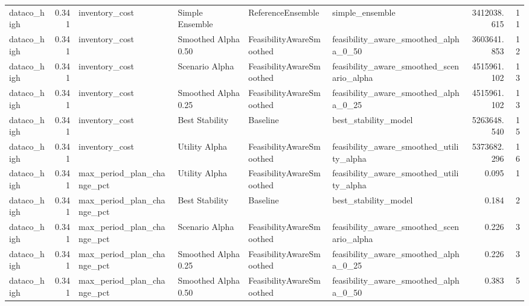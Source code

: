 \begin{table}
{\begin{tabular}{lrllllrr}
   dataco\_high &             0.341 &              inventory\_cost &       Simple Ensemble &         ReferenceEnsemble &                                    simple\_ensemble &   3412038.615 &              11 \\
   dataco\_high &             0.341 &              inventory\_cost &   Smoothed Alpha 0.50 &  FeasibilityAwareSmoothed &              feasibility\_aware\_smoothed\_alpha\_0\_50 &   3603641.853 &              12 \\
   dataco\_high &             0.341 &              inventory\_cost &        Scenario Alpha &  FeasibilityAwareSmoothed &          feasibility\_aware\_smoothed\_scenario\_alpha &   4515961.102 &              13 \\
   dataco\_high &             0.341 &              inventory\_cost &   Smoothed Alpha 0.25 &  FeasibilityAwareSmoothed &              feasibility\_aware\_smoothed\_alpha\_0\_25 &   4515961.102 &              13 \\
   dataco\_high &             0.341 &              inventory\_cost &        Best Stability &                  Baseline &                               best\_stability\_model &   5263648.540 &              15 \\
   dataco\_high &             0.341 &              inventory\_cost &         Utility Alpha &  FeasibilityAwareSmoothed &           feasibility\_aware\_smoothed\_utility\_alpha &   5373682.296 &              16 \\
   dataco\_high &             0.341 &  max\_period\_plan\_change\_pct &         Utility Alpha &  FeasibilityAwareSmoothed &           feasibility\_aware\_smoothed\_utility\_alpha &         0.095 &               1 \\
   dataco\_high &             0.341 &  max\_period\_plan\_change\_pct &        Best Stability &                  Baseline &                               best\_stability\_model &         0.184 &               2 \\
   dataco\_high &             0.341 &  max\_period\_plan\_change\_pct &        Scenario Alpha &  FeasibilityAwareSmoothed &          feasibility\_aware\_smoothed\_scenario\_alpha &         0.226 &               3 \\
   dataco\_high &             0.341 &  max\_period\_plan\_change\_pct &   Smoothed Alpha 0.25 &  FeasibilityAwareSmoothed &              feasibility\_aware\_smoothed\_alpha\_0\_25 &         0.226 &               3 \\
   dataco\_high &             0.341 &  max\_period\_plan\_change\_pct &   Smoothed Alpha 0.50 &  FeasibilityAwareSmoothed &              feasibility\_aware\_smoothed\_alpha\_0\_50 &         0.383 &               5 \\

\end{tabular}}
\end{table}
